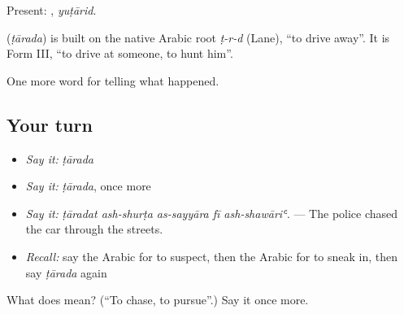 Present: , \emph{yuṭārid}.

\begin{cousinweb}
\textbf{} (\emph{ṭārada}) is built on the native Arabic root \emph{ṭ-r-d} (Lane), \textquotedblleft{}to drive away\textquotedblright{}. It is Form III, \textquotedblleft{}to drive at someone, to hunt him\textquotedblright{}.
\end{cousinweb}

\begin{grammarlens}[title={What you've built}]
One more word for telling what happened.
\end{grammarlens}

\subsection*{Your turn}
\begin{itemize}
\raggedright
  \item \emph{Say it:} \emph{ṭārada}
  \item \emph{Say it:} \emph{ṭārada}, once more
  \item \emph{Say it:} \emph{ṭāradat ash-shurṭa as-sayyāra fī ash-shawāriʿ.} — The police chased the car through the streets.
  \item \emph{Recall:} say the Arabic for to suspect, then the Arabic for to sneak in, then say \emph{ṭārada} again
\end{itemize}

\begin{tcolorbox}[breakable,colback=teal!4,colframe=teal!35!black,title={Before you move on}]
What does  mean? (\textquotedblleft{}To chase, to pursue\textquotedblright{}.) Say it once more.
\end{tcolorbox}
